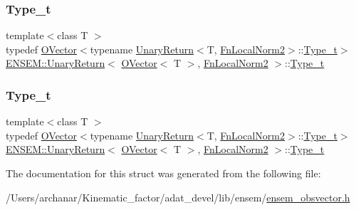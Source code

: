 \subsubsection{\texorpdfstring{Type\_t}{Type\_t}\hspace{0.1cm}{\footnotesize\ttfamily [1/2]}}
{\footnotesize\ttfamily template$<$class T $>$ \\
typedef \mbox{\hyperlink{classENSEM_1_1OVector}{O\+Vector}}$<$typename \mbox{\hyperlink{structENSEM_1_1UnaryReturn}{Unary\+Return}}$<$T, \mbox{\hyperlink{structENSEM_1_1FnLocalNorm2}{Fn\+Local\+Norm2}}$>$\+::\mbox{\hyperlink{structENSEM_1_1UnaryReturn_3_01OVector_3_01T_01_4_00_01FnLocalNorm2_01_4_ae6ea88d668b9a06249f8681572c8a7d4}{Type\+\_\+t}}$>$ \mbox{\hyperlink{structENSEM_1_1UnaryReturn}{E\+N\+S\+E\+M\+::\+Unary\+Return}}$<$ \mbox{\hyperlink{classENSEM_1_1OVector}{O\+Vector}}$<$ T $>$, \mbox{\hyperlink{structENSEM_1_1FnLocalNorm2}{Fn\+Local\+Norm2}} $>$\+::\mbox{\hyperlink{structENSEM_1_1UnaryReturn_3_01OVector_3_01T_01_4_00_01FnLocalNorm2_01_4_ae6ea88d668b9a06249f8681572c8a7d4}{Type\+\_\+t}}}

\mbox{\label{structENSEM_1_1UnaryReturn_3_01OVector_3_01T_01_4_00_01FnLocalNorm2_01_4_ae6ea88d668b9a06249f8681572c8a7d4}} 
\subsubsection{\texorpdfstring{Type\_t}{Type\_t}\hspace{0.1cm}{\footnotesize\ttfamily [2/2]}}
{\footnotesize\ttfamily template$<$class T $>$ \\
typedef \mbox{\hyperlink{classENSEM_1_1OVector}{O\+Vector}}$<$typename \mbox{\hyperlink{structENSEM_1_1UnaryReturn}{Unary\+Return}}$<$T, \mbox{\hyperlink{structENSEM_1_1FnLocalNorm2}{Fn\+Local\+Norm2}}$>$\+::\mbox{\hyperlink{structENSEM_1_1UnaryReturn_3_01OVector_3_01T_01_4_00_01FnLocalNorm2_01_4_ae6ea88d668b9a06249f8681572c8a7d4}{Type\+\_\+t}}$>$ \mbox{\hyperlink{structENSEM_1_1UnaryReturn}{E\+N\+S\+E\+M\+::\+Unary\+Return}}$<$ \mbox{\hyperlink{classENSEM_1_1OVector}{O\+Vector}}$<$ T $>$, \mbox{\hyperlink{structENSEM_1_1FnLocalNorm2}{Fn\+Local\+Norm2}} $>$\+::\mbox{\hyperlink{structENSEM_1_1UnaryReturn_3_01OVector_3_01T_01_4_00_01FnLocalNorm2_01_4_ae6ea88d668b9a06249f8681572c8a7d4}{Type\+\_\+t}}}



The documentation for this struct was generated from the following file\+:\begin{DoxyCompactItemize}
\item 
/\+Users/archanar/\+Kinematic\+\_\+factor/adat\+\_\+devel/lib/ensem/\mbox{\hyperlink{lib_2ensem_2ensem__obsvector_8h}{ensem\+\_\+obsvector.\+h}}\end{DoxyCompactItemize}
